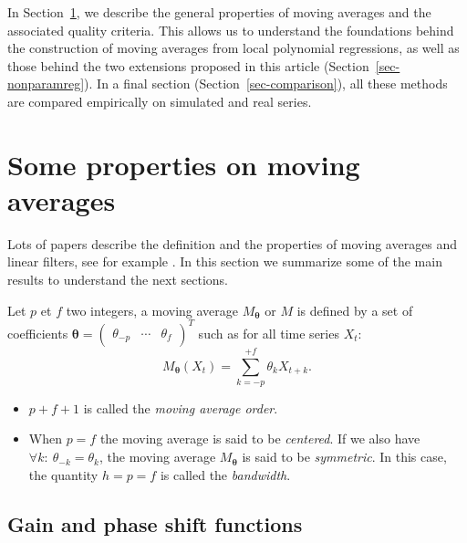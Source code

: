 \documentclass[
]{article}
\newcommand\transp[1]{{#1}^T}
\newcommand\1{\mathds{1}}
\begin{document}
In Section~\ref{sec-propMM}, we describe the general properties of
moving averages and the associated quality criteria. This allows us to
understand the foundations behind the construction of moving averages
from local polynomial regressions, as well as those behind the two
extensions proposed in this article (Section~\ref{sec-nonparamreg}). In
a final section (Section~\ref{sec-comparison}), all these methods are
compared empirically on simulated and real series.

\section{Some properties on moving averages}\label{sec-propMM}

Lots of papers describe the definition and the properties of moving
averages and linear filters, see for example \textcite{ch12HBSA}. In
this section we summarize some of the main results to understand the
next sections.

Let \(p\) et \(f\) two integers, a moving average
\(M_{\boldsymbol\theta}\) or \(M\) is defined by a set of coefficients
\(\boldsymbol\theta=\transp{\begin{pmatrix}\theta_{-p}&\cdots&\theta_{f}\end{pmatrix}}\)
such as for all time series \(X_t\): \[
M_{\boldsymbol\theta}(X_t)=\sum_{k=-p}^{+f}\theta_kX_{t+k}.
\]

\begin{itemize}
\item
  \(p+f+1\) is called the \emph{moving average order}.
\item
  When \(p=f\) the moving average is said to be \emph{centered}. If we
  also have \(\forall k:\:\theta_{-k} = \theta_k\), the moving average
  \(M_{\boldsymbol\theta}\) is said to be \emph{symmetric}. In this
  case, the quantity \(h=p=f\) is called the \emph{bandwidth}.
\end{itemize}

\subsection{Gain and phase shift functions}\label{subsec:gain-deph}
\end{document}
